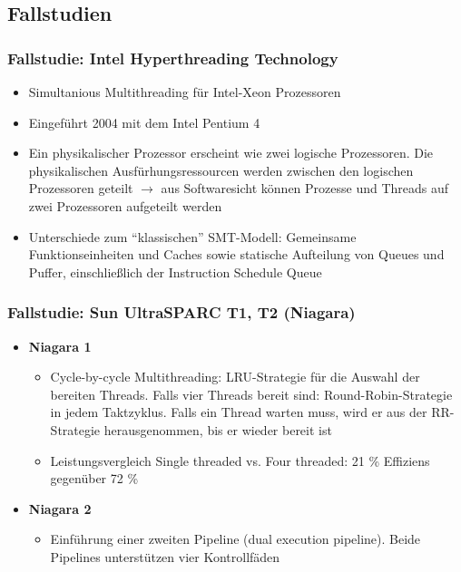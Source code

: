 \subsection{Fallstudien}

\subsubsection{Fallstudie: Intel Hyperthreading Technology}
\begin{itemize}
	\item Simultanious Multithreading für Intel-Xeon Prozessoren
	\item Eingeführt 2004 mit dem Intel Pentium 4
	\item Ein physikalischer Prozessor erscheint wie zwei logische Prozessoren. Die physikalischen Ausfürhungsressourcen werden zwischen den logischen Prozessoren geteilt \(\rightarrow\) aus Softwaresicht können Prozesse und Threads auf zwei Prozessoren aufgeteilt werden
	\item Unterschiede zum "`klassischen"' SMT-Modell: Gemeinsame Funktionseinheiten und Caches sowie statische Aufteilung von Queues und Puffer, einschließlich der Instruction Schedule Queue
\end{itemize}

\subsubsection{Fallstudie: Sun UltraSPARC T1, T2 (Niagara)}
\begin{itemize}
	\item \textbf{Niagara 1}
	\begin{itemize}
		\item Cycle-by-cycle Multithreading: LRU-Strategie für die Auswahl der bereiten Threads. Falls vier Threads bereit sind: Round-Robin-Strategie in jedem Taktzyklus. Falls ein Thread warten muss, wird er aus der RR-Strategie herausgenommen, bis er wieder bereit ist
		\item Leistungsvergleich Single threaded vs. Four threaded: 21 \% Effiziens gegenüber 72 \%
	\end{itemize}
	\item \textbf{Niagara 2}
	\begin{itemize}
		\item Einführung einer zweiten Pipeline (dual execution pipeline). Beide Pipelines unterstützen vier Kontrollfäden
	\end{itemize}
\end{itemize}

